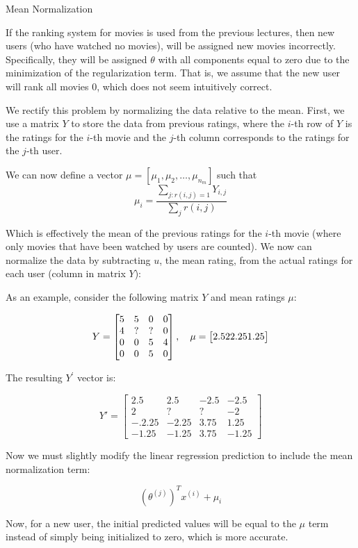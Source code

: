 \documentclass[a4paper,11pt]{report}
\begin{document}
Mean Normalization

If the ranking system for movies is used from the previous lectures, then new users (who have watched no movies), will be assigned new movies incorrectly. Specifically, they will be assigned $\theta$ with all components equal to zero due to the minimization of the regularization term. That is, we assume that the new user will rank all movies 0, which does not seem intuitively correct.

We rectify this problem by normalizing the data relative to the mean. First, we use a matrix $Y$ to store the data from previous ratings, where the $i$-th row of $Y$ is the ratings for the $i$-th movie and the $j$-th column corresponds to the ratings for the $j$-th user.

We can now define a vector $\mu = [\mu_1, \mu_2, \dots , \mu_{n_m}]$ such that $$\mu_i = \frac{\sum_{j:r(i,j)=1}{Y_{i,j}}}{\sum_{j}{r(i,j)}}$$

Which is effectively the mean of the previous ratings for the $i$-th movie (where only movies that have been watched by users are counted). We now can normalize the data by subtracting $u$, the mean rating, from the actual ratings for each user (column in matrix $Y$):

As an example, consider the following matrix $Y$ and mean ratings $\mu$:

$$Y =
\begin{bmatrix}
    5 & 5 & 0 & 0  \\
    4 & ? & ? & 0  \\
    0 & 0 & 5 & 4 \\
    0 & 0 & 5 & 0 \\
\end{bmatrix},
\quad
 \mu =
\begin{bmatrix}
    2.5 \newline
    2  \newline
    2.25 \newline
    1.25 \newline
\end{bmatrix}$$

The resulting $Y^\prime$ vector is:

$$Y' =
\begin{bmatrix}
  2.5    & 2.5   & -2.5 & -2.5 \\
  2      & ?     & ?    & -2 \\
  -.2.25 & -2.25 & 3.75 & 1.25 \\
  -1.25  & -1.25 & 3.75 & -1.25
\end{bmatrix}$$

Now we must slightly modify the linear regression prediction to include the mean normalization term:

$$(\theta^{(j)})^T x^{(i)} + \mu_i$$

Now, for a new user, the initial predicted values will be equal to the $\mu$ term instead of simply being initialized to zero, which is more accurate.
\end{document}
